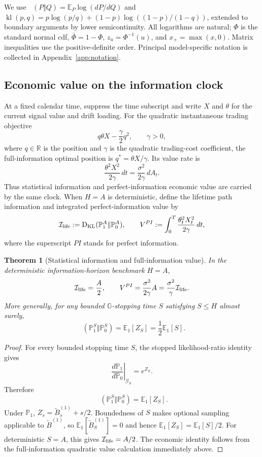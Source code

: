 \documentclass[11pt]{article}
\numberwithin{equation}{section}
\theoremstyle{plain}
\newtheorem{theorem}{Theorem}[section]
\theoremstyle{definition}
\theoremstyle{remark}
\DeclareMathOperator{\KL}{D_{\mathrm{KL}}}
\newcommand{\Pzero}{\mathbb P_0}
\newcommand{\Pone}{\mathbb P_1}
\newcommand{\Eone}{\mathbb E_1}
\newcommand{\Ginfo}{\mathbb G}
\begin{document}
We use $\KL(P\Vert Q)=\mathbb E_P\log(dP/dQ)$ and $\operatorname{kl}(p,q)=p\log(p/q)+(1-p)\log((1-p)/(1-q))$, extended to boundary arguments by lower semicontinuity. All logarithms are natural; $\Phi$ is the standard normal cdf, $\bar\Phi=1-\Phi$, $z_u=\Phi^{-1}(u)$, and $x_+=\max(x,0)$. Matrix inequalities use the positive-definite order. Principal model-specific notation is collected in Appendix~\ref{app:notation}.

\subsection{Economic value on the information clock}\label{economic-value-information-clock}

At a fixed calendar time, suppress the time subscript and write $X$ and $\theta$
for the current signal value and drift loading. For the quadratic instantaneous trading objective
\[
q\theta X-\frac{\gamma}{2}q^2,
\qquad \gamma>0,
\]
where \(q\in\mathbb R\) is the position and \(\gamma\) is the quadratic trading-cost coefficient, the full-information optimal position is \(q^*=\theta X/\gamma\). Its value rate is
\[
\frac{\theta^2X^2}{2\gamma}\,dt
=\frac{\sigma^2}{2\gamma}\,dA_t.
\]
Thus statistical information and perfect-information economic value are carried by the same clock. When $H=A$ is deterministic, define the lifetime path information and integrated perfect-information value by
\[
\mathcal I_{\rm life}:=\KL(\Pone^A\Vert\Pzero^A),
\qquad
V^{PI}:=\int_0^T\frac{\theta_t^2X_t^2}{2\gamma}\,dt,
\]
where the superscript $PI$ stands for perfect information.

\begin{theorem}[Statistical information and full-information value]
In the deterministic information-horizon benchmark $H=A$,
\[
\mathcal I_{\rm life}=\frac A2,
\qquad
V^{PI}=\frac{\sigma^2}{2\gamma}A
=\frac{\sigma^2}{\gamma}\mathcal I_{\rm life}.
\]
More generally, for any bounded $\Ginfo$-stopping time $S$ satisfying $S\le H$ almost surely,
\[
\KL(\Pone^S\Vert\Pzero^S)=\Eone[Z_S]
=\frac12\Eone[S].
\]
\end{theorem}

\begin{proof}
For every bounded stopping time \(S\), the stopped likelihood-ratio identity gives
\[
\left.\frac{d\Pone}{d\Pzero}\right|_{\mathcal G_S}=e^{Z_S}.
\]
Therefore
\[
\KL(\Pone^S\Vert\Pzero^S)=\Eone[Z_S].
\]
Under \(\Pone\), \(Z_s=\widetilde B_s^{(1)}+s/2\). Boundedness of \(S\) makes optional sampling applicable to \(\widetilde B^{(1)}\), so \(\Eone[\widetilde B_S^{(1)}]=0\) and hence \(\Eone[Z_S]=\Eone[S]/2\). For deterministic \(S=A\), this gives \(\mathcal I_{\rm life}=A/2\). The economic identity follows from the full-information quadratic value calculation immediately above.
\end{proof}
\end{document}
